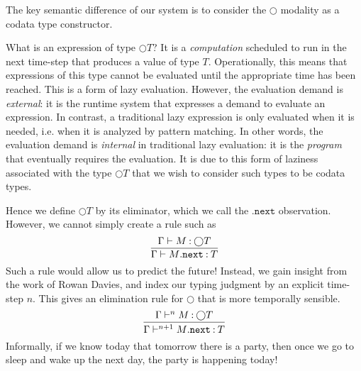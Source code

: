 \documentclass[acmsmall, natbib=false]{acmart}
\renewcommand{\circle}{\bigcirc}
\renewcommand{\next}{\mathtt{.next}}
\begin{document}
The key semantic difference of our system is to consider the $\circle$ modality
as a codata type constructor.

What is an expression of type $\circle T$?
It is a \emph{computation} scheduled to run in the next time-step that produces
a value of type $T$.
Operationally, this means that expressions of this type cannot be evaluated
until the appropriate time has been reached.
This is a form of lazy evaluation.
However, the evaluation demand is \emph{external}: it is the runtime
system that expresses a demand to evaluate an expression.
In contrast, a traditional lazy expression is only evaluated when it is needed,
i.e. when it is analyzed by pattern matching. In other words, the evaluation
demand is \emph{internal} in traditional lazy evaluation: it is the
\emph{program} that eventually requires the evaluation.
It is due to this form of laziness associated with the type $\circle T$ that we
wish to consider such types to be codata types.

Hence we define $\circle T$ by its eliminator, which we call the $\next$
observation.
However, we cannot simply create a rule such as
%
\begin{equation*}
  \infer{
    \Gamma \proves M\next \hastype T
  }{
    \Gamma \proves M \hastype \circle T
  }
\end{equation*}
%
Such a rule would allow us to predict the future!
%
Instead, we gain insight from the work of Rowan Davies\cite{davies-ltl}, and
index our typing judgment by an explicit time-step $n$.
This gives an elimination rule for $\circle$ that is more temporally sensible.
%
\begin{equation*}
  \infer{
    \Gamma \proves^{n+1} M\next \hastype T
  }{
    \Gamma \proves^n M \hastype \circle T
  }
\end{equation*}
%
Informally, if we know today that tomorrow there is a party, then once we go to
sleep and wake up the next day, the party is happening today!
\end{document}
